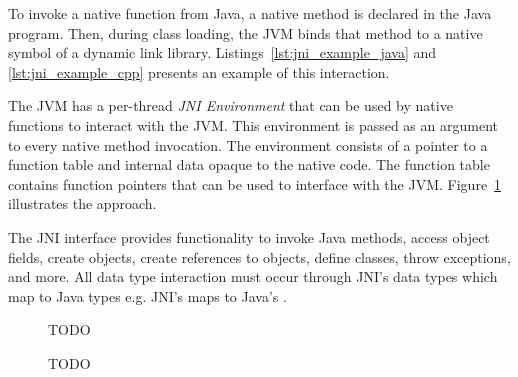 To invoke a native function from Java, a native method is declared in the Java program. Then, during class loading, the JVM binds that method to a native symbol of a dynamic link library. Listings~\ref{lst:jni_example_java} and \ref{lst:jni_example_cpp} presents an example of this interaction.

\begin{figure}[b]
\par\noindent\begin{minipage}[t]{.45\textwidth}

\end{minipage}\hfill
\begin{minipage}[t]{.5\textwidth}

\end{minipage}
\caption*{} %
\end{figure}

The JVM has a per-thread \emph{JNI Environment} that can be used by native functions to interact with the JVM. This environment is passed as an argument to every native method invocation. The environment consists of a pointer to a function table and internal data opaque to the native code. The function table contains function pointers that can be used to interface with the JVM. Figure~\ref{fig:jni_function_table} illustrates the approach.

The JNI interface provides functionality to invoke Java methods, access object fields, create objects, create references to objects, define classes, throw exceptions, and more. All data type interaction must occur through JNI's data types which map to Java types e.g. JNI's  maps to Java's .

\begin{figure}[h]
\caption{TODO}
\label{fig:jni_function_table}
TODO
\end{figure}

